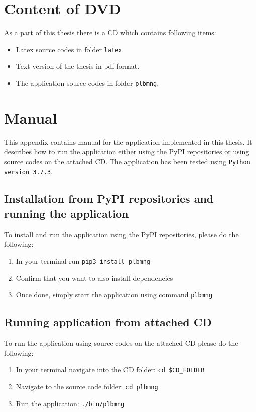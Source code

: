 \chapter{Content of DVD}
As a part of this thesis there is a CD which contains following items:
\begin{itemize}
	\item Latex source codes in folder \texttt{latex}.
	\item Text version of the thesis in pdf format.
	\item The application source codes in folder \texttt{plbmng}.
\end{itemize}

\chapter{Manual}
This appendix contains manual for the application implemented in this thesis. It describes how to run the application either using the PyPI repositories or using source codes on the attached CD. The application has been tested using \texttt{Python version 3.7.3}.
\section{Installation from PyPI repositories and running the application}
To install and run the application using the PyPI repositories, please do the following:\\
\begin{enumerate}
	\item In your terminal run \texttt{pip3 install plbmng}
	\item Confirm that you want to also install dependencies
	\item Once done, simply start the application using command \texttt{plbmng}
\end{enumerate}

\section{Running application from attached CD}
To run the application using source codes on the attached CD please do the following:\\
\begin{enumerate}
	\item In your terminal navigate into the CD folder: \texttt{cd \$CD\_FOLDER}
	\item Navigate to the source code folder: \texttt{cd plbmng}
	\item Run the application: \texttt{./bin/plbmng}
\end{enumerate}